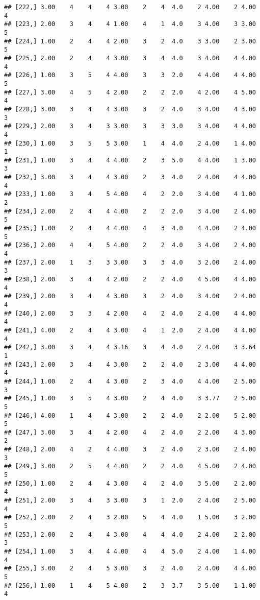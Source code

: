 \documentclass[]{article}
\begin{document}
\begin{verbatim}
## [222,] 3.00    4    4    4 3.00    2    4  4.0    2 4.00    2 4.00    4
## [223,] 2.00    3    4    4 1.00    4    1  4.0    3 4.00    3 3.00    5
## [224,] 1.00    2    4    4 2.00    3    2  4.0    3 3.00    2 3.00    5
## [225,] 2.00    2    4    4 3.00    3    4  4.0    3 4.00    4 4.00    4
## [226,] 1.00    3    5    4 4.00    3    3  2.0    4 4.00    4 4.00    5
## [227,] 3.00    4    5    4 2.00    2    2  2.0    4 2.00    4 5.00    4
## [228,] 3.00    3    4    4 3.00    3    2  4.0    3 4.00    4 3.00    3
## [229,] 2.00    3    4    3 3.00    3    3  3.0    3 4.00    4 4.00    4
## [230,] 1.00    3    5    5 3.00    1    4  4.0    2 4.00    1 4.00    1
## [231,] 1.00    3    4    4 4.00    2    3  5.0    4 4.00    1 3.00    3
## [232,] 3.00    3    4    4 3.00    2    3  4.0    2 4.00    4 4.00    4
## [233,] 1.00    3    4    5 4.00    4    2  2.0    3 4.00    4 1.00    2
## [234,] 2.00    2    4    4 4.00    2    2  2.0    3 4.00    2 4.00    5
## [235,] 1.00    2    4    4 4.00    4    3  4.0    4 4.00    2 4.00    5
## [236,] 2.00    4    4    5 4.00    2    2  4.0    3 4.00    2 4.00    4
## [237,] 2.00    1    3    3 3.00    3    3  4.0    3 2.00    2 4.00    3
## [238,] 2.00    3    4    4 2.00    2    2  4.0    4 5.00    4 4.00    4
## [239,] 2.00    3    4    4 3.00    3    2  4.0    3 4.00    2 4.00    4
## [240,] 2.00    3    3    4 2.00    4    2  4.0    2 4.00    4 4.00    4
## [241,] 4.00    2    4    4 3.00    4    1  2.0    2 4.00    4 4.00    4
## [242,] 3.00    3    4    4 3.16    3    4  4.0    2 4.00    3 3.64    1
## [243,] 2.00    3    4    4 3.00    2    2  4.0    2 3.00    4 4.00    4
## [244,] 1.00    2    4    4 3.00    2    3  4.0    4 4.00    2 5.00    3
## [245,] 1.00    3    5    4 3.00    2    4  4.0    3 3.77    2 5.00    5
## [246,] 4.00    1    4    4 3.00    2    2  4.0    2 2.00    5 2.00    5
## [247,] 3.00    3    4    4 2.00    4    2  4.0    2 2.00    4 3.00    2
## [248,] 2.00    4    2    4 4.00    3    2  4.0    2 3.00    2 4.00    3
## [249,] 3.00    2    5    4 4.00    2    2  4.0    4 5.00    2 4.00    5
## [250,] 1.00    2    4    4 3.00    4    2  4.0    3 5.00    2 2.00    4
## [251,] 2.00    3    4    3 3.00    3    1  2.0    2 4.00    2 5.00    4
## [252,] 2.00    2    4    3 2.00    5    4  4.0    1 5.00    3 2.00    5
## [253,] 2.00    2    4    4 3.00    4    4  4.0    2 4.00    2 2.00    3
## [254,] 1.00    3    4    4 4.00    4    4  5.0    2 4.00    1 4.00    4
## [255,] 3.00    2    4    5 3.00    3    2  4.0    2 4.00    4 4.00    5
## [256,] 1.00    1    4    5 4.00    2    3  3.7    3 5.00    1 1.00    4

\end{verbatim}
\end{document}
